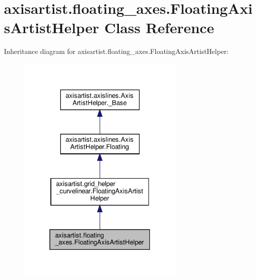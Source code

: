\hypertarget{classaxisartist_1_1floating__axes_1_1FloatingAxisArtistHelper}{}\section{axisartist.\+floating\+\_\+axes.\+Floating\+Axis\+Artist\+Helper Class Reference}
\label{classaxisartist_1_1floating__axes_1_1FloatingAxisArtistHelper}


Inheritance diagram for axisartist.\+floating\+\_\+axes.\+Floating\+Axis\+Artist\+Helper\+:
\nopagebreak
\begin{figure}[H]
\begin{center}
\leavevmode
\includegraphics[width=232pt]{classaxisartist_1_1floating__axes_1_1FloatingAxisArtistHelper__inherit__graph}
\end{center}
\end{figure}


